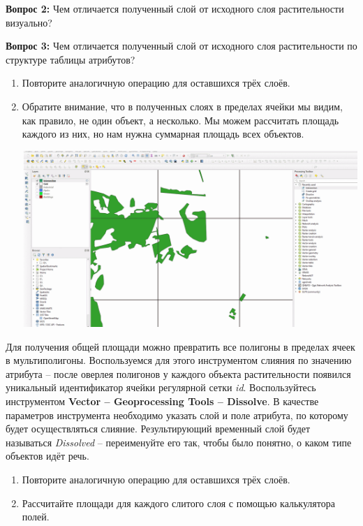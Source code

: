 \documentclass[
  12pt,
]{book}
\begin{document}
\textbf{Вопрос 2:} Чем отличается полученный слой от исходного слоя растительности визуально?

\textbf{Вопрос 3:} Чем отличается полученный слой от исходного слоя растительности по структуре таблицы атрибутов?

\begin{enumerate}
\def\labelenumi{\arabic{enumi}.}
\setcounter{enumi}{2}
\item
  Повторите аналогичную операцию для оставшихся трёх слоёв.
\item
  Обратите внимание, что в полученных слоях в пределах ячейки мы видим, как правило, не один объект, а несколько. Мы можем рассчитать площадь каждого из них, но нам нужна суммарная площадь всех объектов.

  \includegraphics{images/Ex06_SpatRelations/Separate_polygons.gif}
\end{enumerate}

Для получения общей площади можно превратить все полигоны в пределах ячеек в мультиполигоны. Воспользуемся для этого инструментом слияния по значению атрибута -- после оверлея полигонов у каждого объекта растительности появился уникальный идентификатор ячейки регулярной сетки \emph{id}. Воспользуйтесь инструментом \textbf{Vector -- Geoprocessing Tools -- Dissolve}. В качестве параметров инструмента необходимо указать слой и поле атрибута, по которому будет осуществляться слияние. Результирующий временный слой будет называться \emph{Dissolved} -- переименуйте его так, чтобы было понятно, о каком типе объектов идёт речь.

\begin{enumerate}
\def\labelenumi{\arabic{enumi}.}
\setcounter{enumi}{4}
\item
  Повторите аналогичную операцию для оставшихся трёх слоёв.
\item
  Рассчитайте площади для каждого слитого слоя с помощью калькулятора полей.
\end{enumerate}
\end{document}

